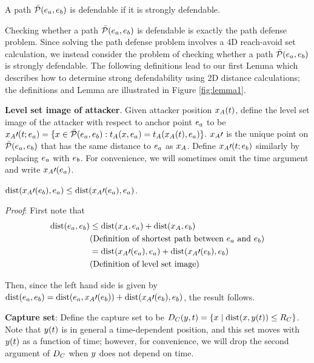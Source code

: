 \begin{rem}
A path $\bar{\mathcal{P}}(e_a,e_b)$ is defendable if it is strongly defendable.
\end{rem}

Checking whether a path $\bar{\mathcal{P}}(e_a,e_b)$ is defendable is exactly the path defense problem. Since solving the path defense problem involves a 4D reach-avoid set calculation, we instead consider the problem of checking whether a path $\bar{\mathcal{P}}(e_a,e_b)$ is strongly defendable. The following definitions lead to our first Lemma which describes how to determine strong defendability using 2D distance calculations; the definitions and Lemma are illustrated in Figure \ref{fig:lemma1}.

\begin{defn} %
\textbf{Level set image of attacker}. Given attacker position $x_A(t)$, define the level set image of the attacker with respect to anchor point $e_a$ to be $x_A\prime(t;e_a) = \{x\in\bar{\mathcal{P}}(e_a,e_b): t_A(x,e_a) = t_A(x_A(t),e_a)\}$. $x_A\prime$ is the unique point on $\bar{\mathcal{P}}(e_a,e_b)$ that has the same distance to $e_a$ as $x_A$. Define $x_A\prime(t;e_b)$ similarly by replacing $e_a$ with $e_b$. For convenience, we will sometimes omit the time argument and write $x_A\prime(e_a)$.
\end{defn}

\begin{rem}
\label{rem:image_of_a}
$\text{dist}(x_A\prime(e_b),e_a) \le \text{dist}(x_A\prime(e_a),e_a)$. 

\textit{Proof}:
First note that
\begin{equation*}
\begin{aligned}
\text{dist}(e_a,e_b) &\le \text{dist}(x_A,e_a) + \text{dist}(x_A,e_b)\\
& \text{(Definition of shortest path between $e_a$ and $e_b$)} \\
& = \text{dist}(x_A\prime(e_a),e_a) + \text{dist}(x_A\prime(e_b),e_b) \\
& \text{(Definition of level set image)}
\end{aligned}
\end{equation*}

Then, since the left hand side is given by $\text{dist}(e_a,e_b) = \text{dist}(e_a,x_A\prime(e_b))+\text{dist}(x_A\prime(e_b),e_b)$, the result follows.
\end{rem}

\begin{defn} %
\textbf{Capture set}: Define the capture set to be $D_C(y,t)=\{x \mid \text{dist}(x,y(t))\leq R_C\}$. Note that $y(t)$ is in general a time-dependent position, and this set moves with $y(t)$ as a function of time; however, for convenience, we will drop the second argument of $D_C$ when $y$ does not depend on time.
\end{defn}

